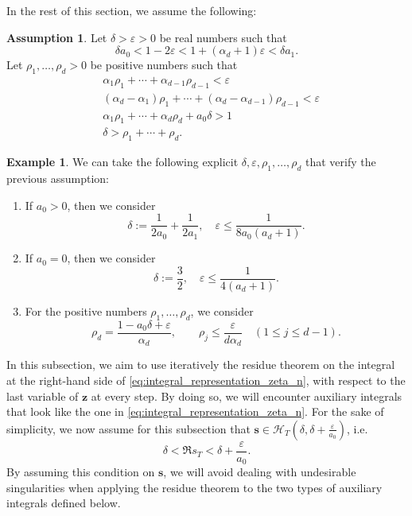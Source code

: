 \documentclass[a4paper,12pt]{article}
\theoremstyle{definition}
\newtheorem{assu}[thm]{Assumption}
\newtheorem{example}[thm]{Example}
\numberwithin{equation}{section}
\begin{document}
In the rest of this section, we assume the following:
\begin{assu}
\label{assumption:delta_epsilon_rho}
Let $\delta>\varepsilon>0$ be real numbers such that
\begin{equation}
    \delta a_0<1-2\varepsilon<1+(\alpha_d+1)\varepsilon<\delta a_1. \label{eq:ineq_delta_a0_delta_a1}
\end{equation}
Let $\rho_1,\ldots,\rho_d>0$ be positive numbers such that
\begin{align}
    &\alpha_1\rho_1+\cdots +\alpha_{d-1} \rho_{d-1}<\varepsilon \label{eq:ineq_alpha_rho_epsilon}\\
    &(\alpha_d-\alpha_1)\rho_1+\cdots +(\alpha_d-\alpha_{d-1}) \rho_{d-1}<\varepsilon \label{eq:ineq_alpha_rho_epsilon_bis}\\
    &\alpha_1\rho_1+\cdots +\alpha_d\rho_d+a_0\delta>1 \label{eq:ineq_delta_sum_alpha_rho} \\
    &\delta>\rho_1+\cdots +\rho_d. \label{eq:ineq_delta_sum_rho}
\end{align}
\end{assu}

\begin{example}
We can take the following explicit $\delta, \varepsilon, \rho_1,\ldots,\rho_d$ that verify the previous assumption:
\begin{enumerate}[label=(\roman*)]
    \item If $a_0>0$, then we consider
    $$\delta:=\frac{1}{2a_0}+\frac{1}{2a_1}, \quad \varepsilon \leq \frac{1}{8a_0(a_d+1)}. $$
    \item If $a_0=0$, then we consider
    $$ \delta:=\frac{3}{2}, \quad \varepsilon \leq \frac{1}{4(a_d+1)}. $$
    \item For the positive numbers $\rho_1,\ldots,\rho_d$, we consider 
    $$ \rho_d = \frac{1-a_0\delta+\varepsilon}{\alpha_d}, \qquad \rho_j \leq \frac{\varepsilon}{d\alpha_d} \quad (1 \leq j \leq d-1). $$
\end{enumerate}
\end{example}

In this subsection, we aim to use iteratively the residue theorem on the integral at the right-hand side of \eqref{eq:integral_representation_zeta_n}, with respect to the last variable of $\mathbf{z}$ at every step. By doing so, we will encounter auxiliary integrals that look like the one in \eqref{eq:integral_representation_zeta_n}. For the sake of simplicity, we now assume for this subsection that $\mathbf{s} \in \mathcal{H}_T(\delta,\delta+\frac{\varepsilon}{a_0})$, i.e. 
$$ \delta < \Re s_T < \delta+\frac{\varepsilon}{a_0}. $$
By assuming this condition on $\mathbf{s}$, we will avoid dealing with undesirable singularities when applying the residue theorem to the two types of auxiliary integrals defined below.
\end{document}
